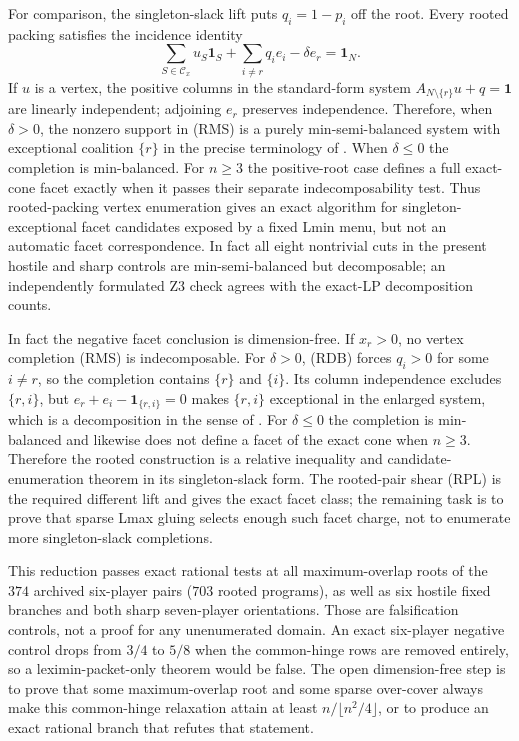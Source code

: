 \documentclass[11pt]{article}
\begin{document}
For comparison, the singleton-slack lift puts
$q_i=1-p_i$ off the root.  Every rooted packing satisfies the incidence
identity
\[
 \sum_{S\in\mathcal C_x}u_S\mathbf1_S
 +\sum_{i\ne r}q_i e_i-\delta e_r=\mathbf1_N.          \tag{RMS}
\]
If $u$ is a vertex, the positive columns in the standard-form system
$A_{N\setminus\{r\}}u+q=\mathbf1$ are linearly independent; adjoining
$e_r$ preserves independence.  Therefore, when $\delta>0$, the nonzero
support in (RMS) is a purely min-semi-balanced system with exceptional
coalition $\{r\}$ in the precise terminology of
\citet[Lemma~2(c)]{StudenyKratochvil2022}.  When $\delta\le0$ the completion
is min-balanced.  For $n\ge3$ the positive-root case defines a full
exact-cone facet exactly when it passes their separate indecomposability
test.  Thus rooted-packing vertex enumeration gives an exact algorithm for
singleton-exceptional facet candidates exposed by a fixed Lmin menu, but not
an automatic facet correspondence.  In fact all eight nontrivial cuts in
the present hostile and sharp controls are min-semi-balanced but decomposable;
an independently formulated Z3 check agrees with the exact-LP decomposition
counts.

In fact the negative facet conclusion is dimension-free.  If $x_r>0$, no
vertex completion (RMS) is indecomposable.  For $\delta>0$, (RDB) forces
$q_i>0$ for some $i\ne r$, so the completion contains $\{r\}$ and $\{i\}$.
Its column independence excludes $\{r,i\}$, but
$e_r+e_i-\mathbf1_{\{r,i\}}=0$ makes $\{r,i\}$ exceptional in the enlarged
system, which is a decomposition in the sense of
\citet[Definition~7]{StudenyKratochvil2022}.  For $\delta\le0$ the completion
is min-balanced and likewise does not define a facet of the exact cone when
$n\ge3$.  Therefore the rooted construction is a relative inequality and
candidate-enumeration theorem in its singleton-slack form.  The rooted-pair
shear (RPL) is the required different lift and gives the exact facet class;
the remaining task is to prove that sparse Lmax gluing selects enough such
facet charge, not to enumerate more singleton-slack completions.

This reduction passes exact rational tests at all maximum-overlap roots of
the $374$ archived six-player pairs ($703$ rooted programs), as well as six
hostile fixed branches and both sharp seven-player orientations.  Those are
falsification controls, not a proof for any unenumerated domain.  An exact
six-player negative control drops from $3/4$ to $5/8$ when the common-hinge
rows are removed entirely, so a leximin-packet-only theorem would be false.
The open dimension-free step is to prove that some maximum-overlap root and
some sparse over-cover always make this common-hinge relaxation attain at
least $n/\lfloor n^2/4\rfloor$, or to produce an exact rational branch that
refutes that statement.
\end{document}
